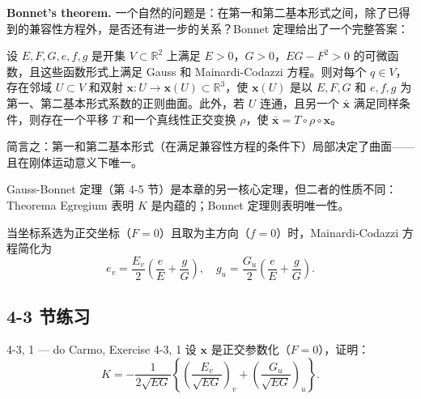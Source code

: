 \textbf{Bonnet's theorem.} 一个自然的问题是：在第一和第二基本形式之间，除了已得到的兼容性方程外，是否还有进一步的关系？Bonnet 定理给出了一个完整答案：

\begin{Theorem}[Bonnet]\label{bonnet}
设 $E,F,G,e,f,g$ 是开集 $V \subset \mathbb{R}^2$ 上满足 $E>0$，$G>0$，$EG-F^2>0$ 的可微函数，且这些函数形式上满足 Gauss 和 Mainardi-Codazzi 方程。则对每个 $q \in V$，存在邻域 $U \subset V$ 和双射 $\mathbf{x}: U \to \mathbf{x}(U) \subset \mathbb{R}^3$，使 $\mathbf{x}(U)$ 是以 $E,F,G$ 和 $e,f,g$ 为第一、第二基本形式系数的正则曲面。此外，若 $U$ 连通，且另一个 $\bar{\mathbf{x}}$ 满足同样条件，则存在一个平移 $T$ 和一个真线性正交变换 $\rho$，使 $\bar{\mathbf{x}} = T \circ \rho \circ \mathbf{x}$。
\end{Theorem}

简言之：第一和第二基本形式（在满足兼容性方程的条件下）局部决定了曲面——且在刚体运动意义下唯一。

\begin{Remark}
Gauss-Bonnet 定理（第 4-5 节）是本章的另一核心定理，但二者的性质不同：Theorema Egregium 表明 $K$ 是内蕴的；Bonnet 定理则表明唯一性。
\end{Remark}

\begin{Remark}
当坐标系选为正交坐标（$F=0$）且取为主方向（$f=0$）时，Mainardi-Codazzi 方程简化为
\[
e_v = \frac{E_v}{2}\left(\frac{e}{E}+\frac{g}{G}\right),\quad
g_u = \frac{G_u}{2}\left(\frac{e}{E}+\frac{g}{G}\right).
\label{eq:mainardi-codazzi-simplified}
\]
\end{Remark}

\subsection*{4-3 节练习}

\begin{exercise}{4-3, 1 — do Carmo, Exercise 4-3, 1}
设 $\mathbf{x}$ 是正交参数化（$F=0$），证明：
\[
K = -\frac{1}{2\sqrt{EG}}\left\{\left(\frac{E_v}{\sqrt{EG}}\right)_v + \left(\frac{G_u}{\sqrt{EG}}\right)_u\right\}.
\]
\end{exercise}

